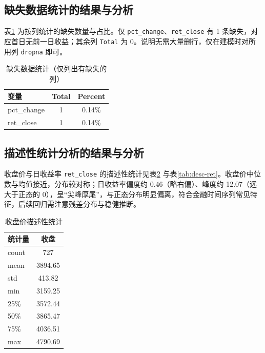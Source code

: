 \documentclass[12pt,a4paper]{article}
\begin{document}
\subsection{缺失数据统计的结果与分析}
表\ref{tab:missing} 为按列统计的缺失数量与占比。仅 \texttt{pct\_change}、\texttt{ret\_close} 有 1 条缺失，对应首日无前一日收益；其余列 \texttt{Total} 为 0。说明无需大量删行，仅在建模时对所用列 \texttt{dropna} 即可。

\begin{table}[H]
\centering
\caption{缺失数据统计（仅列出有缺失的列）}
\label{tab:missing}
\begin{tabular}{lcc}
\toprule
变量 & Total & Percent \\
\midrule
pct\_change & 1 & 0.14\% \\
ret\_close   & 1 & 0.14\% \\
\bottomrule
\end{tabular}
\end{table}

\subsection{描述性统计分析的结果与分析}
收盘价与日收益率 \texttt{ret\_close} 的描述性统计见表\ref{tab:desc-close} 与表\ref{tab:desc-ret}。收盘价中位数与均值接近，分布较对称；日收益率偏度约 0.46（略右偏）、峰度约 12.07（远大于正态的 0），呈“尖峰厚尾”，与正态分布明显偏离，符合金融时间序列常见特征，后续回归需注意残差分布与稳健推断。

\begin{table}[H]
\centering
\caption{收盘价描述性统计}
\label{tab:desc-close}
\begin{tabular}{lc}
\toprule
统计量 & 收盘 \\
\midrule
count & 727 \\
mean  & 3894.65 \\
std   & 413.82 \\
min   & 3159.25 \\
25\%  & 3572.44 \\
50\%  & 3865.47 \\
75\%  & 4036.51 \\
max   & 4790.69 \\
\bottomrule
\end{tabular}
\end{table}
\end{document}
